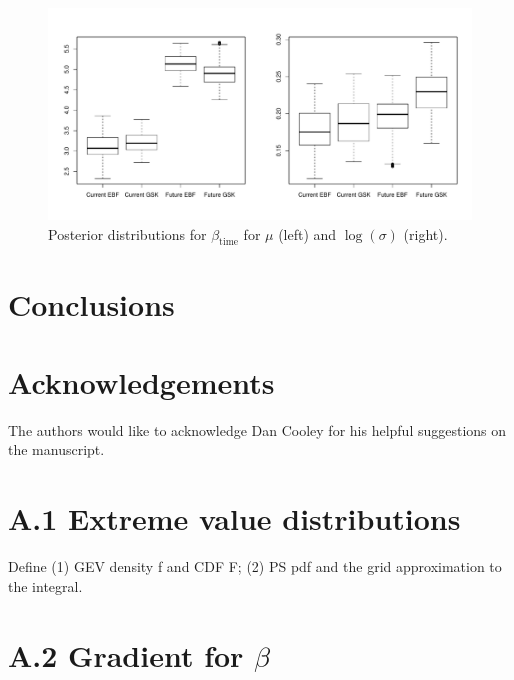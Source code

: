 \documentclass[11pt]{article}
\begin{document}
\begin{figure}  %
  \centering
  \includegraphics[width=\linewidth]{plots/precip-post-time.pdf}
  \caption{Posterior distributions for $\beta_{\text{time}}$ for $\mu$ (left) and $\log(\sigma)$ (right).}
  \label{ebfig:precip-qs}
\end{figure}

\section{Conclusions}\label{ebs:con}

\section*{Acknowledgements}
The authors would like to acknowledge Dan Cooley for his helpful suggestions on the manuscript.

\section*{A.1 Extreme value distributions}
Define (1) GEV density f and CDF F; (2) PS pdf  and the grid approximation to the integral.

\section*{A.2 Gradient for $\beta$}

\begin{singlespace}


\end{singlespace}
\end{document}
